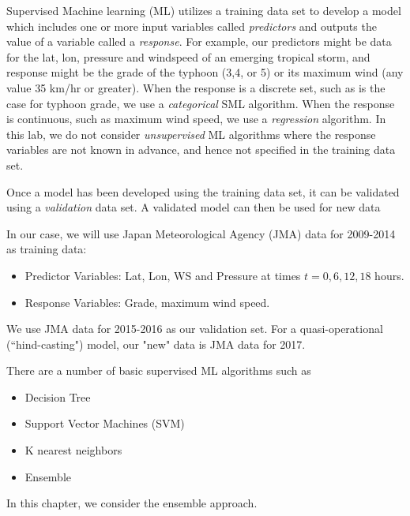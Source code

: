 \documentclass{SBCbookchapter}
\begin{document}
Supervised Machine learning (ML) utilizes a training data set to develop a model which includes one or more input variables called \emph{predictors} and outputs the value of a variable called a \emph{response}.  For example, our predictors might be data for  the lat, lon, pressure and windspeed of an emerging tropical storm, and response might be the grade of the typhoon (3,4, or 5) or its  maximum wind (any value  35 km/hr or greater).  When the response is a discrete set, such as is the case for typhoon grade, we use a \emph{categorical} SML algorithm. When the response is continuous, such as maximum wind speed, we use a \emph{regression} algorithm.  In this lab, we do not consider \emph{unsupervised} ML algorithms where the response variables are not known in advance, and hence not specified in the training data set.  

Once a model has been developed using the training data set, it can be validated using a \emph{validation} data set. 
A validated model can then be used for new data

In our case, we will use Japan Meteorological Agency (JMA) data for 2009-2014 as training data:

\begin{itemize}
\item Predictor Variables: Lat, Lon, WS and Pressure at times $t=0,6,12,18$ hours.
\item Response Variables: Grade, maximum wind speed.
\end{itemize}
{\flushleft We use} JMA data for 2015-2016 as our validation set.  For a quasi-operational (``hind-casting") model, our "new" data is JMA data for 2017.


There are a number of basic supervised ML algorithms \cite{Bon} such as

\begin{itemize}
    \item Decision Tree 
    \item Support Vector Machines (SVM)
    \item K nearest neighbors
    \item Ensemble
\end{itemize}

{\flushleft In} this chapter, we consider the ensemble approach.
\end{document}
